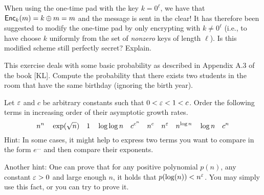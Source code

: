\documentclass[a4paper,10pt,landscape,twocolumn]{scrartcl}
\begin{document}
\begin{exercise}
When using the one-time pad with the key $k=0^\ell$, we have that $\mathsf{Enc}_k(m)=k \oplus m = m$ and the message is sent in the clear! It has therefore been suggested to modify the one-time pad by only encrypting with $k \neq 0^\ell$ (i.e., to have \gen choose $k$ uniformly from the set of \emph{nonzero} keys of length $\ell$). Is this modified scheme still perfectly secret? Explain.
\end{exercise}

\begin{exercise}
This exercise deals with some basic probability as described in Appendix A.3 of the book [KL]. Compute the probability that there exists two students in the room that have the same birthday (ignoring the birth year).
\end{exercise}

\begin{exercise}
Let $\varepsilon$ and $c$ be arbitrary constants such that $0<\varepsilon<1<c$. Order the following terms in increasing order of their
  asymptotic growth rates.
\[ n^n \quad \exp(\sqrt{n}) \quad 1 \quad \log\log n \quad
c^{c^n} \quad n^c \quad n^\varepsilon \quad n^{\log n} \quad \log n \quad c^n
\]
{\small Hint: In some cases, it might help to express two terms you
  want to compare in the form $e^{\ldots}$ and then compare their
  exponents.}

{\small Another hint: One can prove that for any positive polynomial
  $p(n)$, any constant $\varepsilon>0$ and large enough $n$, it holds that
  $p(\log(n)) < n^\varepsilon$. You may simply use this fact, or you can try
  to prove it.}
\end{exercise}
\end{document}
